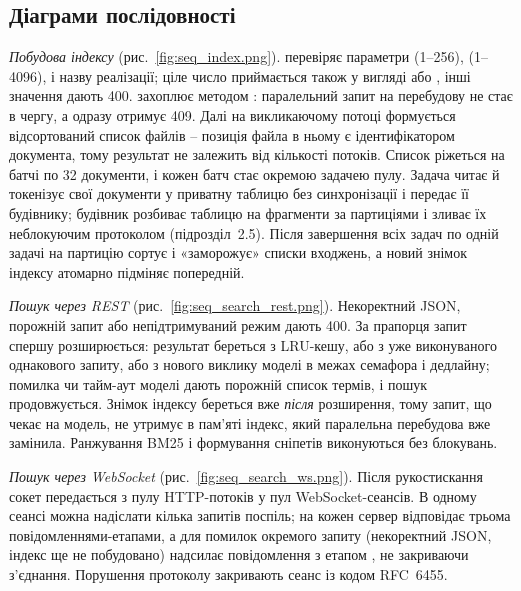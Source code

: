 
\subsection{Діаграми послідовності}

\textit{Побудова індексу} (рис.~\ref{fig:seq_index.png}).  перевіряє параметри
 (1--256),  (1--4096),  і назву реалізації;
ціле число приймається також у вигляді  або , інші значення дають 400.
 захоплює  методом : паралельний запит на
перебудову не стає в чергу, а одразу отримує 409. Далі на викликаючому потоці формується
відсортований список файлів -- позиція файла в ньому є ідентифікатором документа, тому
результат не залежить від кількості потоків. Список ріжеться на батчі по 32 документи, і
кожен батч стає окремою задачею пулу. Задача читає й токенізує свої документи у приватну
таблицю без синхронізації і передає її будівнику; будівник розбиває таблицю на фрагменти за
партиціями і зливає їх неблокуючим протоколом (підрозділ~2.5). Після завершення всіх задач
по одній задачі на партицію сортує і «заморожує» списки входжень, а новий знімок індексу
атомарно підміняє попередній.


\textit{Пошук через REST} (рис.~\ref{fig:seq_search_rest.png}). Некоректний JSON, порожній
запит або непідтримуваний режим дають 400. За прапорця  запит спершу
розширюється: результат береться з LRU-кешу, або з уже виконуваного однакового запиту, або
з нового виклику моделі в межах семафора і дедлайну; помилка чи тайм-аут моделі дають
порожній список термів, і пошук продовжується. Знімок індексу береться вже \textit{після}
розширення, тому запит, що чекає на модель, не утримує в пам'яті індекс, який паралельна
перебудова вже замінила. Ранжування BM25 і формування сніпетів виконуються без блокувань.


\textit{Пошук через WebSocket} (рис.~\ref{fig:seq_search_ws.png}). Після рукостискання сокет
передається з пулу HTTP-потоків у пул WebSocket-сеансів. В одному сеансі можна надіслати
кілька запитів поспіль; на кожен сервер відповідає трьома повідомленнями-етапами, а для
помилок окремого запиту (некоректний JSON, індекс ще не побудовано) надсилає повідомлення з
етапом , не закриваючи з'єднання. Порушення протоколу закривають сеанс із кодом
RFC~6455.

